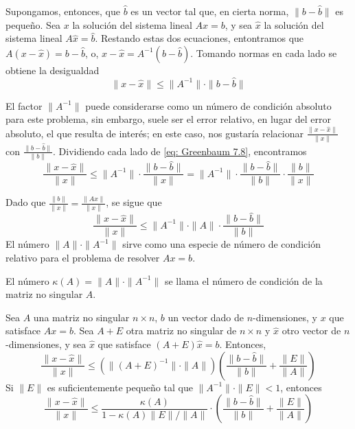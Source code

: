 Supongamos, entonces, que $\hat{b}$ es un vector tal que, en cierta norma, $\|b - \hat{b}\|$ es pequeño. Sea $x$ la solución del sistema lineal $Ax = b$, y sea $\hat{x}$ la solución del sistema lineal $A \hat{x} = \hat{b}$. Restando estas dos ecuaciones, entontramos que $A(x - \hat{x}) = b - \hat{b}$, o, $x - \hat{x} = A^{-1} (b - \hat{b})$. Tomando normas en cada lado se obtiene la desigualdad
\begin{equation}
    \label{eq: Greenbaum 7.8}
    \| x - \hat{x} \| \leq \| A^{-1} \| \cdot \| b - \hat{b} \|
\end{equation}

El factor $\| A^{-1} \|$ puede considerarse como un número de condición absoluto para este problema, sin embargo, suele ser el error relativo, en lugar del error absoluto, el que resulta de interés; en este caso, nos gustaría relacionar $\frac{\| x - \hat{x} \|}{\|x\|}$ con $\frac{\| b - \hat{b} \|}{\| b \|}$. Dividiendo cada lado de \ref{eq: Greenbaum 7.8}, encontramos
\[ \frac{\| x - \hat{x} \|}{\| x \|} \leq \| A^{-1} \| \cdot \frac{\| b - \hat{b} \|}{\| x \|}  = \| A^{-1} \| \cdot \frac{\| b - \hat{b} \|}{\|b\|} \cdot \frac{\|b\|}{\|x\|}\]

Dado que $\frac{\|b\|}{\|x\|} = \frac{\|Ax\|}{\|x\|}$, se sigue que
\begin{equation}
    \label{eq: Greenbaum 7.9}
    \frac{\| x - \hat{x} \|}{\|x\|} \leq \| A^{-1} \| \cdot \|A\| \cdot \frac{\| b - \hat{b}\|}{\|b\|}
\end{equation}
El número $\|A\| \cdot \|A^{-1}\|$ sirve como una especie de número de condición relativo para el problema de resolver $Ax = b$.

\begin{definition}
El número $\kappa (A) = \|A\| \cdot \|A^{-1}\|$ se llama el número de condición de la matriz no singular $A$.
\end{definition}

\begin{theorem}
Sea $A$ una matriz no singular $n \times n$, $b$ un vector dado de $n$-dimensiones, y $x$ que satisface $Ax = b$. Sea $A + E$ otra matriz no singular de $n \times n$ y $\hat{x}$ otro vector de $n$-dimensiones, y sea $\hat{x}$ que satisface $(A + E)\hat{x} = b$. Entonces,
\begin{equation}
    \label{eq: Greenbaum 7.10}
    \frac{\| x - \hat{x}\|}{\|x\|} \leq \left( \| (A + E)^{-1} \| \cdot \|A\| \right) \left( \frac{\|b - \hat{b}\|}{\|b\|} + \frac{\|E\|}{\|A\|} \right)
\end{equation}
Si $\|E\|$ es suficientemente pequeño tal que $\|A^{-1}\| \cdot \|E\| < 1$, entonces
\begin{equation}
    \label{eq: Greenbaum 7.11}
    \frac{\| x - \hat{x}\|}{\|x\|} \leq \frac{\kappa(A)}{1 - \kappa(A) \|E\| / \|A\|} \cdot \left( \frac{\|b - \hat{b}\|}{\|b\|} + \frac{\|E\|}{\|A\|} \right)
\end{equation}
\end{theorem}

